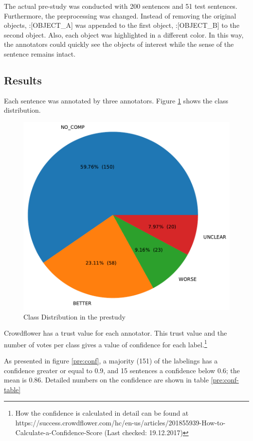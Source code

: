 The actual pre-study was conducted with 200 sentences and 51 test sentences. Furthermore, the preprocessing was changed. Instead of removing the original objects, :[OBJECT\_A] was appended to the first object, :[OBJECT\_B] to the second object. Also, each object was highlighted in a different color. In this way, the annotators could quickly see the objects of interest while the sense of the sentence remains intact.

\label{sec:annotation-guidelines}
\subsection{Results}
Each sentence was annotated by three annotators. Figure \ref{pre:dist} shows the class distribution.

\begin{figure}[h]
\centering
\caption{Class Distribution in the prestudy}
\label{pre:dist}
\includegraphics[scale=0.6]{images/prestudy/label_distribution.pdf}
\end{figure}

Crowdflower has a trust value for each annotator. This trust value and the number of votes per class gives a value of confidence for each label.\footnote{How the confidence is calculated in detail can be found at https://success.crowdflower.com/hc/en-us/articles/201855939-How-to-Calculate-a-Confidence-Score (Last checked: 19.12.2017)}


As presented in figure \ref{pre:conf}, a majority (151) of the labelings has a confidence greater or equal to 0.9, and 15 sentences a confidence below 0.6; the mean is 0.86. Detailed numbers on the confidence are shown in table \ref{pre:conf-table}

